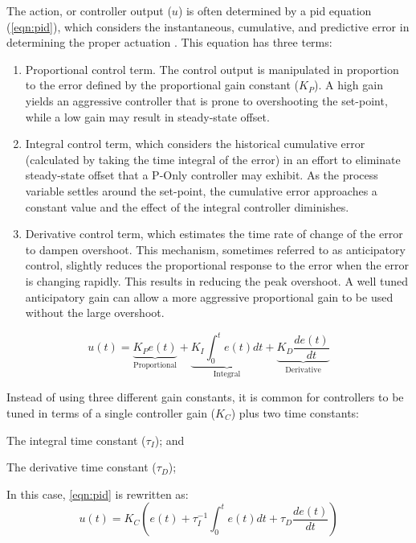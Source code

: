 The action, or controller output ($u$) is often determined by a \acf{pid} equation (\ref{eqn:pid}), which considers the instantaneous, cumulative, and predictive error in determining the proper actuation \cite[Ch. 5]{Bequette}. This equation has three terms:
\begin{enumerate}
\item Proportional control term. The control output is manipulated in proportion to the error defined by the proportional gain constant ($K_P$). A high gain yields an aggressive controller that is prone to overshooting the set-point, while a low gain may result in steady-state offset.  
\item Integral control term, which considers the historical cumulative error (calculated by taking the time integral of the error) in an effort to eliminate steady-state offset that a P-Only controller may exhibit. As the process variable settles around the set-point, the cumulative error approaches a constant value and the effect of the integral controller diminishes.
\item Derivative control term, which estimates the time rate of change of the error to dampen overshoot. This mechanism, sometimes referred to as anticipatory control, slightly reduces the proportional response to the error when the error is changing rapidly. This results in reducing the peak overshoot. A well tuned anticipatory gain can allow a more aggressive proportional gain to be used without the large overshoot.
\end{enumerate}

\begin{equation}\label{eqn:pid}
    u(t) 
    = \underbrace{K_P e(t)}_{\text{Proportional}} 
    + \underbrace{K_I \int_0^t e(t)dt}_{\text{Integral}} 
    + \underbrace{K_D \frac{de(t)}{dt}}_{\text{Derivative}}
\end{equation}

Instead of using three different gain constants, it is common for controllers to be tuned in terms of a single controller gain ($K_C$) plus two time constants: 
\begin{enumerate*}
    \item The integral time constant ($\tau_I$); and
    \item The derivative time constant ($\tau_D$);
\end{enumerate*}
In this case, \ref{eqn:pid} is rewritten as:
\begin{equation}\label{eqn:pid-tau}
    u(t) = K_C \left( e(t) + \tau_I^{-1} \int_0^t e(t)dt + \tau_D \frac{de(t)}{dt}\right)
\end{equation}

